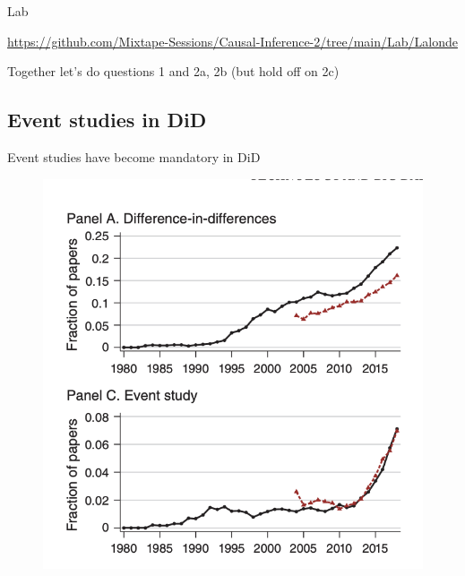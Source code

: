 \documentclass{beamer}
\begin{document}
\begin{frame}{Lab}

\url{https://github.com/Mixtape-Sessions/Causal-Inference-2/tree/main/Lab/Lalonde}

\bigskip

Together let's do questions 1 and 2a, 2b (but hold off on 2c)

\end{frame}



\subsection{Event studies in DiD}

\begin{frame}{Event studies have become mandatory in DiD}

	\begin{figure}
	\includegraphics[scale=0.5]{./lecture_includes/currie_eventstudy.png}
	\end{figure}

\end{frame}
\end{document}
